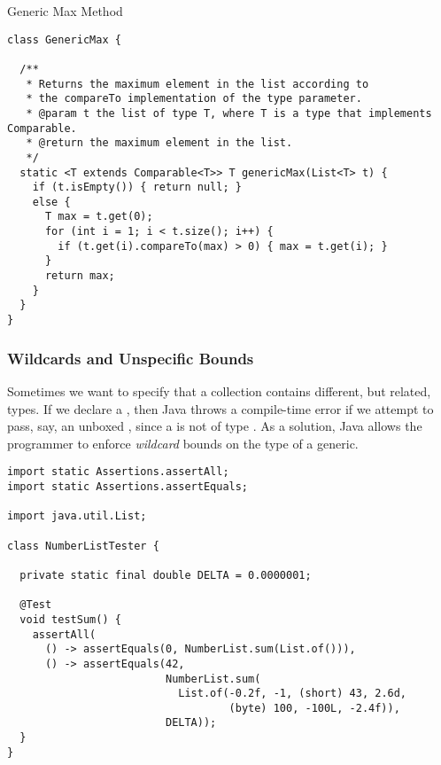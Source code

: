 \begin{cl}[]{Generic Max Method}
\begin{lstlisting}[language=MyJava]
class GenericMax {
  
  /**
   * Returns the maximum element in the list according to 
   * the compareTo implementation of the type parameter.
   * @param t the list of type T, where T is a type that implements Comparable.
   * @return the maximum element in the list.
   */
  static <T extends Comparable<T>> T genericMax(List<T> t) {
    if (t.isEmpty()) { return null; }
    else {
      T max = t.get(0);
      for (int i = 1; i < t.size(); i++) {
        if (t.get(i).compareTo(max) > 0) { max = t.get(i); }
      }
      return max;
    }
  }
}
\end{lstlisting}
\end{cl}

\subsubsection*{Wildcards and Unspecific Bounds}
Sometimes we want to specify that a collection contains different, but related, types. If we declare a , then Java throws a compile-time error if we attempt to pass, say, an unboxed , since a  is not of type . As a solution, Java allows the programmer to enforce \textit{wildcard} bounds on the type of a generic. 


\begin{cl}[]{}
\begin{lstlisting}[language=MyJava]
import static Assertions.assertAll;
import static Assertions.assertEquals;

import java.util.List;

class NumberListTester {

  private static final double DELTA = 0.0000001;

  @Test
  void testSum() {
    assertAll(
      () -> assertEquals(0, NumberList.sum(List.of())),
      () -> assertEquals(42, 
                         NumberList.sum(
                           List.of(-0.2f, -1, (short) 43, 2.6d, 
                                   (byte) 100, -100L, -2.4f)),
                         DELTA));
  }
}
\end{lstlisting}
\end{cl}

